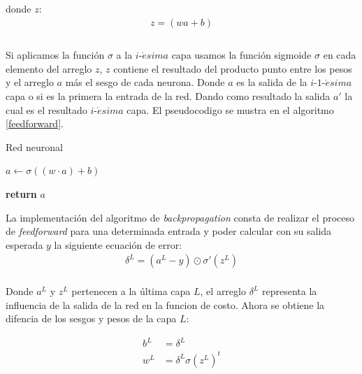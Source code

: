 \documentclass{iccmemoria}
\begin{document}
donde $z$:\\

\begin{equation}
	\begin{split}
	z = (wa + b)\\
	\end{split}
\end{equation}\\

Si aplicamos la función $\sigma$ a la $i$-$\acute{e}sima$ capa usamos la función sigmoide $\sigma$ en cada elemento del arreglo $z$, $z$ contiene el resultado del producto punto entre los pesos y el arreglo $a$ más el sesgo de cada neurona. Donde $a$ es la salida de la $i$-$1$-$\acute{e}sima$ capa o si es la primera la entrada de la red. Dando como resultado la salida $a'$ la cual es el resultado $i$-$\acute{e}sima$ capa. El pseudocodigo se mustra en el algoritmo \ref{feedforward}.\\

\begin{algorithm}[H]
\caption{Red neuronal}\label{feedforward}
\begin{algorithmic}[1]

	\State $a \gets \sigma((w \cdot a)+b)$
\EndFor

\State \textbf{return} $a$
\EndFunction
\end{algorithmic}
\end{algorithm}

La implementación del algoritmo de \emph{backpropagation} consta de realizar el proceso de \emph{feedforward} para una determinada entrada y poder calcular con su salida esperada $y$ la siguiente ecuación de error:\\

\begin{equation}
	\begin{split}
	\delta^L = (a^L-y) \odot \sigma'(z^L)
	\end{split}
\end{equation}\\

Donde $a^{L}$ y $z^{L}$ pertenecen a la última capa $L$, el arreglo $\delta^{L}$ representa la influencia de la salida de la red en la funcion de costo. Ahora se obtiene la difencia de los sesgos y pesos de la capa $L$:

\begin{equation}
	\begin{split}
	b^L & = \delta^L\\
	w^L & = \delta^L \sigma(z^L)^t
	\end{split}
\end{equation}\\
\end{document}
